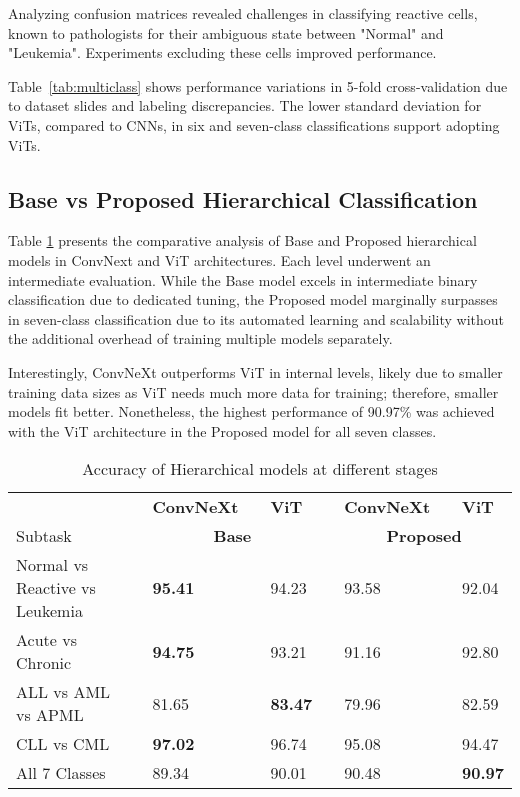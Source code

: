 \documentclass[runningheads]{llncs}
\begin{document}
Analyzing confusion matrices revealed challenges in classifying reactive cells, known to pathologists for their ambiguous state between "Normal" and "Leukemia". Experiments excluding these cells improved performance.

Table~\ref{tab:multiclass} shows performance variations in 5-fold cross-validation due to dataset slides and labeling discrepancies. The lower standard deviation for ViTs, compared to CNNs, in six and seven-class classifications support adopting ViTs.


\subsection{Base vs Proposed Hierarchical Classification}

Table \ref{tab:binary} presents the comparative analysis of Base and Proposed hierarchical models in ConvNext and ViT architectures. Each level underwent an intermediate evaluation. While the Base model excels in intermediate binary classification due to dedicated tuning, the Proposed model marginally surpasses in seven-class classification due to its automated learning and scalability without the additional overhead of training multiple models separately.

Interestingly, ConvNeXt outperforms ViT in internal levels, likely due to smaller training data sizes as ViT needs much more data for training; therefore, smaller models fit better. Nonetheless, the highest performance of 90.97\% was achieved with the ViT architecture in the Proposed model for all seven classes.

\begin{table}[]
\centering
\caption{Accuracy of Hierarchical models at different stages }
\label{tab:binary}
\begin{tabular}{lllllllll}
\hline
                               &  & \textbf{ConvNeXt} &  & \textbf{ViT}   &  & \textbf{ConvNeXt} &  & \textbf{ViT} \\ \cline{3-5} \cline{7-9} 
Subtask                        &  & \multicolumn{3}{c}{\textbf{Base}}      &  & \multicolumn{3}{c}{\textbf{Proposed}}    \\ \cline{1-1} \cline{3-5} \cline{7-9} 

Normal vs Reactive vs Leukemia &  & \textbf{95.41}    &  & 94.23     &  & 93.58      &  & 92.04      \\

Acute vs Chronic     &  & \textbf{94.75}    &  & 93.21          &  & 91.16        &  & 92.80  \\

ALL vs AML   vs APML     &  & 81.65        &  & \textbf{83.47} &  & 79.96       &  & 82.59      \\

CLL vs CML       &  & \textbf{97.02}    &  & 96.74          &  & 95.08         &  & 94.47        \\

All 7 Classes          &  & {89.34}    &  & 90.01        &  & 90.48        &  & \textbf{90.97}      \\ \hline 
\end{tabular}
\end{table}
\end{document}
